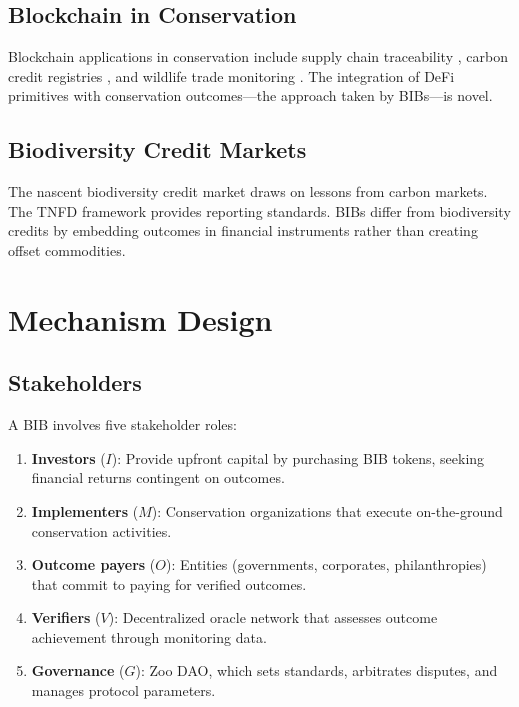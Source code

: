 \documentclass[11pt,a4paper]{article}
\begin{document}
\subsection{Blockchain in Conservation}

Blockchain applications in conservation include supply chain
traceability \citep{howson2019crypto}, carbon credit registries
\citep{schletz2020blockchain}, and wildlife trade monitoring
\citep{dalton2020blockchain}. The integration of DeFi primitives with
conservation outcomes---the approach taken by BIBs---is novel.

\subsection{Biodiversity Credit Markets}

The nascent biodiversity credit market draws on lessons from carbon
markets. The TNFD framework \citep{tnfd2023framework} provides reporting
standards. BIBs differ from biodiversity credits by embedding outcomes in
financial instruments rather than creating offset commodities.


\section{Mechanism Design}
\label{sec:mechanism}

\subsection{Stakeholders}

A BIB involves five stakeholder roles:

\begin{enumerate}
  \item \textbf{Investors} ($I$): Provide upfront capital by purchasing
    BIB tokens, seeking financial returns contingent on outcomes.
  \item \textbf{Implementers} ($M$): Conservation organizations that
    execute on-the-ground conservation activities.
  \item \textbf{Outcome payers} ($O$): Entities (governments,
    corporates, philanthropies) that commit to paying for verified
    outcomes.
  \item \textbf{Verifiers} ($V$): Decentralized oracle network that
    assesses outcome achievement through monitoring data.
  \item \textbf{Governance} ($G$): Zoo DAO, which sets standards,
    arbitrates disputes, and manages protocol parameters.
\end{enumerate}
\end{document}
